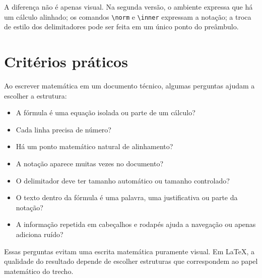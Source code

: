 A diferença não é apenas visual. Na segunda versão, o ambiente expressa que há um cálculo alinhado; os comandos \verb|\norm| e \verb|\inner| expressam a notação; a troca de estilo dos delimitadores pode ser feita em um único ponto do preâmbulo.

\section{Critérios práticos}

Ao escrever matemática em um documento técnico, algumas perguntas ajudam a escolher a estrutura:

\begin{itemize}
    \item A fórmula é uma equação isolada ou parte de um cálculo?
    \item Cada linha precisa de número?
    \item Há um ponto matemático natural de alinhamento?
    \item A notação aparece muitas vezes no documento?
    \item O delimitador deve ter tamanho automático ou tamanho controlado?
    \item O texto dentro da fórmula é uma palavra, uma justificativa ou parte da notação?
    \item A informação repetida em cabeçalhos e rodapés ajuda a navegação ou apenas adiciona ruído?
\end{itemize}

Essas perguntas evitam uma escrita matemática puramente visual. Em \LaTeX, a qualidade do resultado depende de escolher estruturas que correspondem ao papel matemático do trecho.
